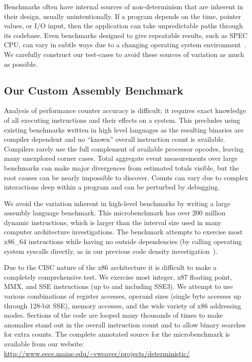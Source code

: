 Benchmarks often have internal sources of non-determinism
that are inherent in their design, usually unintentionally.
If a program depends on the time, pointer values, or I/O input,
then the application can take unpredictable paths through its
codebase.
Even benchmarks designed to give repeatable results,
such as SPEC CPU, can vary in subtle ways due to a changing
operating system environment~\cite{weaver+:iiswc08}.
We carefully construct our test-cases to avoid 
these sources of variation as much as possible.

\subsection{Our Custom Assembly Benchmark}

Analysis of performance counter accuracy is difficult;
it requires exact knowledge of all executing instructions
and their effects on a system.
This precludes using existing benchmarks written in high level languages 
as the resulting binaries are compiler dependent and no
``known'' overall instruction count is available.
Compilers rarely use the full complement of available 
processor opcodes, leaving many unexplored corner cases.
Total aggregate event measurements over large benchmarks can
make major divergences from estimated totals visible, 
but the root causes can be nearly impossible 
to discover.  
Counts can vary due to complex interactions
deep within a program and can be perturbed by debugging.

We avoid the variation inherent in high-level benchmarks
by writing a large assembly language benchmark. 
This microbenchmark has over 200 million dynamic instructions,
which is larger than the interval size used in many computer 
architecture investigations.
The benchmark attempts to exercise most x86\_64 instructions
while having no outside dependencies (by calling 
operating system syscalls directly, as in 
our previous code density investigation~\cite{weaver+:iccd09}).

Due to the CISC nature of the x86 architecture it is difficult to 
make a completely comprehensive test.  
We exercise most integer, x87 floating point,
MMX, and SSE instructions (up to and including SSE3).  
We attempt to use various combinations of 
register accesses, operand sizes (single byte accesses up through
128-bit SSE),
memory accesses, and the wide variety of x86 addressing modes.
Sections of the code are looped many thousands of times to 
make anomalies stand out in the overall instruction count
and to allow binary searches for extra counts.
The complete annotated source for the microbenchmark is available 
from our website:\\
\url{http://www.eece.maine.edu/~vweaver/projects/deterministic/}

